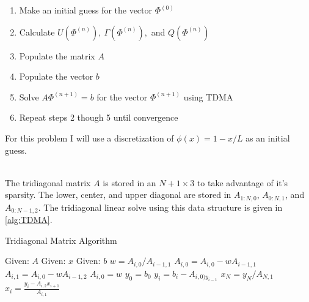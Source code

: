 \documentclass[reqno]{amsart}
\begin{document}
    \begin{enumerate}
        \item Make an initial guess for the vector $\Phi^{(0)}$
        \item Calculate $U(\Phi^{(n)}),\ \Gamma(\Phi^{(n)}),$ and $Q(\Phi^{(n)})$
        \item Populate the matrix $A$
        \item Populate the vector $b$
        \item Solve $A\Phi^{(n+1)} = b$ for the vector $\Phi^{(n+1)}$ using TDMA
        \item Repeat steps 2 though 5 until convergence
    \end{enumerate}
    For this problem I will use a discretization of $\phi(x) = 1 - x/L$ as an initial guess. \\~\

    \noindent The tridiagonal matrix $A$ is stored in an $N+1\times 3$ to take advantage of it's sparsity.
    The lower, center, and upper diagonal are stored in $A_{1:N,0}$, $A_{0:N,1}$, and $A_{0:N-1,2}$.
    The tridiagonal linear solve using this data structure is given in \cref{alg:TDMA}. \\ \vspace{-0.25in}
    \begin{center}\begin{minipage}{0.5\textwidth}\begin{algorithm}[H]
        \caption{Tridiagonal Matrix Algorithm} \label{alg:TDMA}
        \begin{algorithmic}
            \State Given: $A$ 
            \State Given: $x$ 
            \State Given: $b$ 
            \State
             
                \State $w = A_{i,0}/A_{i-1,1}$
                \State $A_{i,0} = A_{i,0} - wA_{i-1,1}$
                \State $A_{i,1} = A_{i,0} - wA_{i-1,2}$
                \State $A_{i,0} = w$
            \EndFor
            \State
            \State $y_0 = b_0$ 
                \State $y_i = b_i - A_{i,0)y_{i - 1}}$
            \EndFor
            \State
            \State $x_N = y_N/A_{N,1}$ 
            \State $x_i = \frac{y_i - A_{i,2}x_{i + 1}}{A_{i,1}}$
            \EndFor
        \end{algorithmic}
    \end{algorithm}\end{minipage}\end{center}
\end{document}
